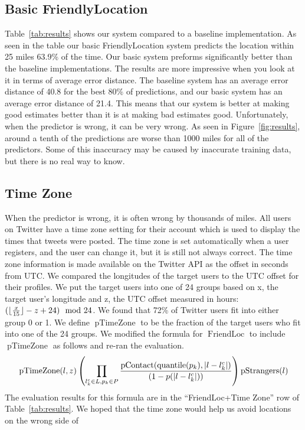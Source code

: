 \documentclass[letterpaper]{article}
\DeclareMathOperator{\pContact}{pContact}
\DeclareMathOperator{\pTimeZone}{pTimeZone}
\DeclareMathOperator{\pStrangers}{pStrangers}
\DeclareMathOperator{\FriendLoc}{FriendLoc}
\DeclareMathOperator{\quantile}{quantile}
\begin{document}
\subsection{Basic FriendlyLocation}

Table~\ref{tab:results} shows our system compared to a baseline implementation.
%
As seen in the table our basic FriendlyLocation system predicts the location
within 25 miles 63.9\% of the time.
%
Our basic system preforms significantly better than the baseline implementations.
%
The results are more impressive when you look at it in terms of average error
distance.
%
The baseline system has an average error distance of 40.8 for the best 80\% of
predictions, and our basic system has an average error distance of 21.4.
%
This means that our system is better at making good estimates better than it is
at making bad estimates good.
%
Unfortunately, when the predictor is wrong, it can be very wrong.
%
As seen in Figure~\ref{fig:results}, around a tenth of the predictions are worse
than 1000 miles for all of the predictors.
%
Some of this inaccuracy may be caused by inaccurate training data, but there is
no real way to know.



\ifdefined\THESIS
\subsection{Time Zone}
When the predictor is wrong, it is often wrong by thousands of miles.
%
All users on Twitter have a time zone setting for their account which is used
to display the times that tweets were posted.
%
The time zone is set automatically when a user registers, and the user can
change it, but it is still not always correct.
%
The time zone information is made available on the Twitter API as the offset
in seconds from UTC.
%
We compared the longitudes of the target users to the UTC offset for their
profiles.
%
We put the target users into one of 24 groups based on x, the target user's
longitude and z, the UTC offset measured in hours:
${(\lfloor {x\over15}\rfloor-z+24)\mod{24}}$.
%
We found that 72\% of Twitter users fit into either group 0 or 1.
%
We define $\pTimeZone$ to be the fraction of the target users who fit into one
of the 24 groups.
%
We modified the formula for $\FriendLoc$ to include $\pTimeZone$ as follows and
re-ran the evaluation.
\[
    \pTimeZone(l,z)
    \left(
        \prod_{l^c_k \in L,p_k \in P}
        {\pContact(\quantile(p_k),|l-l^c_k|) \over (1-p(|l-l^c_k|))}
    \right)
    \pStrangers(l)
\]
The evaluation results for this formula are in the ``FriendLoc+Time Zone'' row
of Table~\ref{tab:results}.
%
We hoped that the time zone would help us avoid locations on the wrong side of
\end{document}

